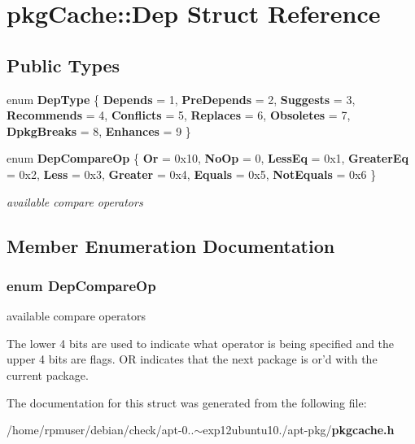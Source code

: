 \section{pkg\-Cache\-:\-:\-Dep \-Struct \-Reference}
\label{structpkgCache_1_1Dep}
\subsection*{\-Public \-Types}
\begin{DoxyCompactItemize}
\item 
enum {\bfseries \-Dep\-Type} \{ \*
{\bfseries \-Depends} = 1, 
{\bfseries \-Pre\-Depends} = 2, 
{\bfseries \-Suggests} = 3, 
{\bfseries \-Recommends} = 4, 
\*
{\bfseries \-Conflicts} = 5, 
{\bfseries \-Replaces} = 6, 
{\bfseries \-Obsoletes} = 7, 
{\bfseries \-Dpkg\-Breaks} = 8, 
\*
{\bfseries \-Enhances} = 9
 \}
\item 
enum {\bf \-Dep\-Compare\-Op} \{ \*
{\bfseries \-Or} = 0x10, 
{\bfseries \-No\-Op} = 0, 
{\bfseries \-Less\-Eq} = 0x1, 
{\bfseries \-Greater\-Eq} = 0x2, 
\*
{\bfseries \-Less} = 0x3, 
{\bfseries \-Greater} = 0x4, 
{\bfseries \-Equals} = 0x5, 
{\bfseries \-Not\-Equals} = 0x6
 \}
\begin{DoxyCompactList}\small\item\em available compare operators \end{DoxyCompactList}\end{DoxyCompactItemize}


\subsection{\-Member \-Enumeration \-Documentation}
\subsubsection[{\-Dep\-Compare\-Op}]{\setlength{\rightskip}{0pt plus 5cm}enum {\bf \-Dep\-Compare\-Op}}\label{structpkgCache_1_1Dep_aa3b0f58e581c41bc31d4b96cc4281ad6}


available compare operators 

\-The lower 4 bits are used to indicate what operator is being specified and the upper 4 bits are flags. \-O\-R indicates that the next package is or'd with the current package. 

\-The documentation for this struct was generated from the following file\-:\begin{DoxyCompactItemize}
\item 
/home/rpmuser/debian/check/apt-\/0..$\sim$exp12ubuntu10./apt-\/pkg/{\bf pkgcache.\-h}\end{DoxyCompactItemize}
